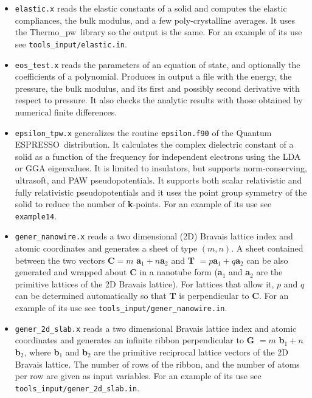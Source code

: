 \documentclass[12pt,a4paper,twoside]{report}
\def\qe{{\sc Quantum ESPRESSO}}
\def\thermo{{\sc Thermo\_pw}}
\begin{document}
\begin{itemize}
\item \texttt{elastic.x} reads the elastic constants of a
solid and computes the elastic compliances, the bulk modulus, and a few
poly-crystalline averages. It uses the \thermo\ library so the output is the
same. 
For an example of its use see \texttt{tools\_input/elastic.in}.

\item \texttt{eos\_test.x} reads the parameters of an equation of state,
and optionally the coefficients of a polynomial. Produces in output
a file with the energy, the pressure, the bulk modulus, and its first
and possibly second derivative with respect to pressure.
It also checks the analytic results with those obtained by numerical
finite differences.

\item \texttt{epsilon\_tpw.x} generalizes the routine
\texttt{epsilon.f90} of the \qe\ distribution. It calculates the 
complex dielectric
constant of a solid as a function of the frequency for independent electrons
using the LDA or GGA eigenvalues. It is limited to insulators, but supports
norm-conserving, ultrasoft, and PAW pseudopotentials. It supports both scalar
relativistic and fully relativistic pseudopotentials and it uses the point
group symmetry of the solid to reduce the number of {\bf k}-points.
For an example of its use see \texttt{example14}.

\item \texttt{gener\_nanowire.x} reads a two dimensional (2D)
Bravais lattice index and atomic coordinates and generates a sheet of type
$(m,n)$. A sheet contained between the two vectors 
{\bf C}$ = m$ {\bf a}$_1 + n ${\bf a}$_2$ and {\bf T} $= p ${\bf a}$_1 + q ${\bf a}$_2$
can be also generated and wrapped about {\bf C} in a nanotube form 
({\bf a}$_1$ and {\bf a}$_2$ are the primitive lattices of the 2D Bravais 
lattice). 
For lattices that allow it, $p$ and $q$ can be determined automatically so that 
{\bf T} is perpendicular to {\bf C}.
For an example of its use see \texttt{tools\_input/gener\_nanowire.in}.

\item \texttt{gener\_2d\_slab.x} reads a two dimensional 
Bravais lattice index and atomic coordinates and generates an infinite ribbon
perpendicular to {\bf G} $= m$ {\bf b}$_1 + n ${\bf b}$_2$, where 
{\bf b}$_1$ and {\bf b}$_2$ are the primitive reciprocal lattice vectors 
of the 2D Bravais lattice. The number of rows of the ribbon, and the number of
atoms per row are given as input variables.
For an example of its use see \texttt{tools\_input/gener\_2d\_slab.in}.


\end{itemize}
\end{document}
